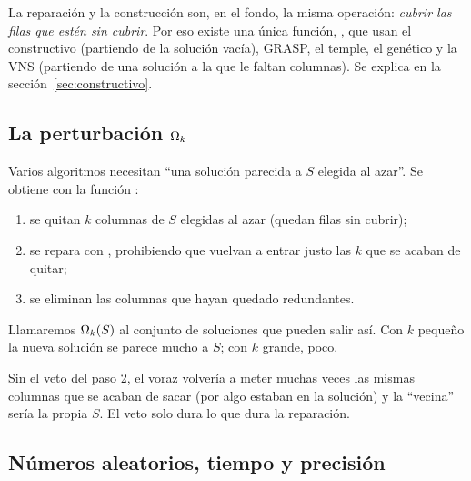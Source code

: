 La reparación y la construcción son, en el fondo, la misma operación: \emph{cubrir las filas
que estén sin cubrir}. Por eso existe una única función, , que usan el
constructivo (partiendo de la solución vacía), GRASP, el temple, el genético y la VNS
(partiendo de una solución a la que le faltan columnas). Se explica en la
sección~\ref{sec:constructivo}.

\subsection{La perturbación \texorpdfstring{$\Omega_{k}$}{Omega\_k}}\label{sec:perturbar}

Varios algoritmos necesitan ``una solución parecida a $S$ elegida al azar''. Se obtiene con la
función :
\begin{enumerate}
  \item se quitan $k$ columnas de $S$ elegidas al azar (quedan filas sin cubrir);
  \item se repara con , prohibiendo que vuelvan a entrar justo las $k$ que se
        acaban de quitar;
  \item se eliminan las columnas que hayan quedado redundantes.
\end{enumerate}
Llamaremos $\Omega_{k}(S)$ al conjunto de soluciones que pueden salir así. Con $k$ pequeño la
nueva solución se parece mucho a $S$; con $k$ grande, poco.

\begin{decision}
Sin el veto del paso 2, el voraz volvería a meter muchas veces las mismas columnas que se
acaban de sacar (por algo estaban en la solución) y la ``vecina'' sería la propia $S$. El
veto solo dura lo que dura la reparación.
\end{decision}


\subsection{Números aleatorios, tiempo y precisión}

